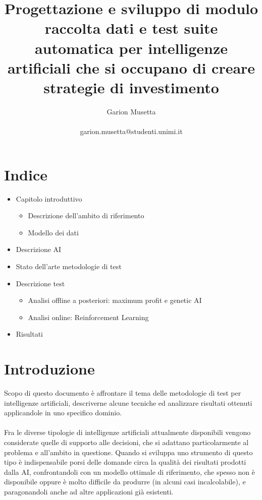 \documentclass{article}
\title{\textbf{Progettazione e sviluppo di modulo raccolta dati e test suite automatica per intelligenze artificiali che si occupano di creare strategie di investimento}}
\author{Garion Musetta\\~\\garion.musetta@studenti.unimi.it}
\numberwithin{equation}{section}
\begin{document}
	\maketitle   
	\newpage
	\tableofcontents

	\section{Indice}
	\begin{itemize}
		\item Capitolo introduttivo
			\begin{itemize}
			\item Descrizione dell'ambito di riferimento
			\item Modello dei dati
			\end{itemize}
			
		\item Descrizione AI
		\item Stato dell'arte metodologie di test
		\item Descrizione test
			\begin{itemize}
				\item Analisi offline a posteriori: maximum profit e genetic AI
				\item Analisi online: Reinforcement Learning
			\end{itemize}
		\item Risultati
	\end{itemize}
	\newpage 
	 
	 
   	\section{Introduzione}
		Scopo di questo documento è affrontare il tema delle metodologie di test per intelligenze artificiali, descriverne alcune tecniche ed analizzare risultati ottenuti applicandole in uno specifico dominio.
		\\~\\
		Fra le diverse tipologie di intelligenze artificiali attualmente disponibili vengono considerate quelle di supporto alle decisioni, che si adattano particolarmente al problema e all'ambito in questione. Quando si sviluppa uno strumento di questo tipo è indispensabile porsi delle domande circa la qualità dei risultati prodotti dalla AI, confrontandoli con un modello ottimale di riferimento, che spesso non è disponibile oppure è molto difficile da produrre (in alcuni casi incalcolabile), e paragonandoli anche ad altre applicazioni già esistenti.
\end{document}
